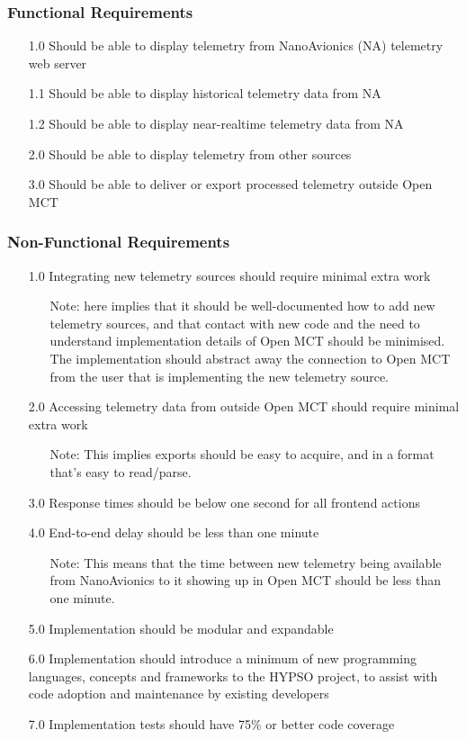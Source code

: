 \subsubsection{Functional Requirements}
\begin{enumerate}
  \item[1.0] Should be able to display telemetry from NanoAvionics (NA) telemetry web server
  \item[1.1] Should be able to display historical telemetry data from NA
  \item[1.2] Should be able to display near-realtime telemetry data from NA
  \item[2.0] Should be able to display telemetry from other sources
  \item[3.0] Should be able to deliver or export processed telemetry outside Open MCT
\end{enumerate}

\subsubsection{Non-Functional Requirements}
\begin{enumerate}
  \item[1.0] Integrating new telemetry sources should require minimal extra work
  \begin{itemize}
    \item[Note:]  here implies that it should be well-documented how to add new telemetry sources, and that contact with new code and the need to understand implementation details of Open MCT should be minimised. The implementation should abstract away the connection to Open MCT from the user that is implementing the new telemetry source.
  \end{itemize}
  \item[2.0] Accessing telemetry data from outside Open MCT should require minimal extra work
  \begin{itemize}
    \item[Note:] This implies exports should be easy to acquire, and in a format that's easy to read/parse.
  \end{itemize}
  \item[3.0] Response times should be below one second for all \gls{frontend} actions
  \item[4.0] End-to-end delay should be less than one minute
  \begin{itemize}
    \item[Note:] This means that the time between new telemetry being available from NanoAvionics to it showing up in Open MCT should be less than one minute.
  \end{itemize}
  \item[5.0] Implementation should be modular and expandable
  \item[6.0] Implementation should introduce a minimum of new programming languages, concepts and frameworks to the HYPSO project, to assist with code adoption and maintenance by existing developers
  \item[7.0] Implementation tests should have 75\% or better code coverage
\end{enumerate}